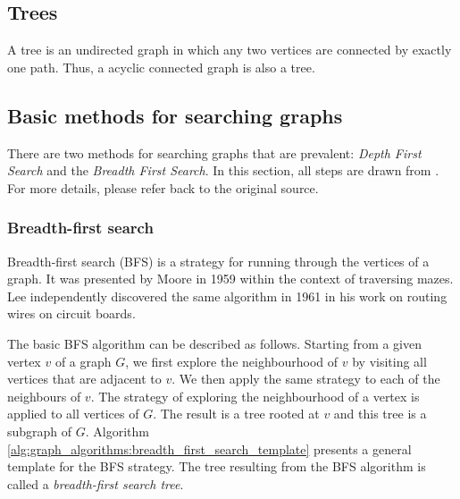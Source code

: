 \subsection{Trees}

A tree is an undirected graph in which any two vertices are connected by exactly one path. 
Thus, a acyclic connected graph is also a tree.


\subsection{Basic methods for searching graphs}


There are two methods for searching graphs that are prevalent: \emph{Depth First Search} and the \emph{Breadth First Search}.
In this section, all steps are drawn from \cite{joyner2010algorithmic}.
For more details, please refer back to the original source.


\subsubsection{Breadth-first search}

Breadth-first search (BFS) is a strategy for running through the
vertices of a graph. 
It was presented by Moore \cite{moore1959shortest} in 1959 within the context of traversing mazes. 
Lee \cite{lee1961algorithm} independently discovered the same algorithm in 1961 in his work on routing wires on circuit boards.

The basic BFS algorithm can be described as follows. 
Starting from a given vertex $v$ of a graph $G$, we first explore the neighbourhood of $v$ by visiting all vertices that are adjacent to $v$. 
We then apply the same strategy to each of the neighbours of $v$. The strategy of exploring the neighbourhood of a vertex is applied to all vertices of $G$. 
The result is a tree rooted at $v$ and this tree is a subgraph of
$G$. 
Algorithm~ \ref{alg:graph_algorithms:breadth_first_search_template}
presents a general template for the BFS strategy. The tree resulting
from the BFS algorithm is called a \emph{breadth-first search tree}.


